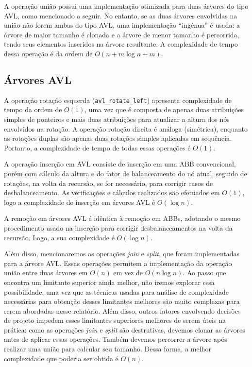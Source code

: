 \documentclass[a4paper,12pt]{report}
\begin{document}
A operação união possui uma implementação otimizada para duas árvores do tipo AVL,
como mencionado a seguir. No entanto, se as duas árvores envolvidas na união não
forem ambas do tipo AVL, uma implementação ``ingênua'' é usada: a árvore de maior
tamanho é clonada e a árvore de menor tamanho é percorrida, tendo seus elementos
inseridos na árvore resultante. A complexidade de tempo dessa operação é da ordem 
de $O(n + m \log{n + m})$. 

\subsection*{Árvores AVL}

A operação rotação esquerda (\texttt{avl\_rotate\_left}) apresenta complexidade de 
tempo da ordem de $O(1)$, uma vez que é composta de apenas duas atribuições simples
de ponteiros e mais duas atribuições para atualizar a altura dos nós envolvidos
na rotação. A operação rotação direita é análoga (simétrica), enquanto as rotações
duplas são apenas duas rotações simples aplicadas em sequência. Portanto, a
complexidade de tempo de todas essas operações é $O(1)$.

A operação inserção em AVL consiste de inserção em uma ABB convencional, porém com
cálculo da altura e do fator de balanceamento do nó atual, seguido de rotações, na
volta da recursão, se for necessário, para corrigir casos de desbalanceamento.
As verificações e cálculos realizados são efetuados em $O(1)$, logo a complexidade
de inserção em árvores AVL é $O(\log n)$.

A remoção em árvores AVL é idêntica à remoção em ABBs, adotando o mesmo procedimento 
usado na inserção para corrigir desbalanceamentos na volta da recursão. 
Logo, a sua complexidade é $O(\log n)$.

Além disso, mencionaremos as operações \textit{join} e \textit{split}, que foram 
implementadas para a árvore AVL. Essas operações permitem a implementação da operação 
união entre duas árvores em $O(n)$ em vez de $O(n \log n)$. Ao passo que \cite{bfs16}
encontra um limitante superior ainda melhor, não iremos explorar essa possibilidade, 
uma vez que as técnicas usadas para análise de complexidade necessárias para obtenção 
desses limitantes melhores são muito complexas para serem abordadas nesse relatório. 
Além disso, outros fatores envolvendo decisões de projeto impedem esses limitantes 
superiores melhores de serem úteis na prática: como as operações \textit{join} e 
\textit{split} são destrutivas, devemos clonar as árvores antes de aplicar essas operações. 
Também devemos percorrer a árvore após realizar uma união para calcular seu tamanho. 
Dessa forma, a melhor complexidade que poderia ser obtida é $O(n)$.
\end{document}
